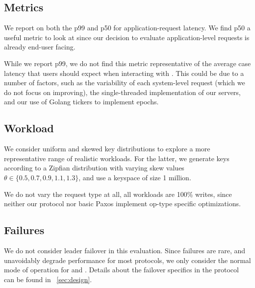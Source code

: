 

\subsection{Metrics}
We report on both the p99 and p50 for application-request latency. 
We find p50 a useful metric to look at since our decision to evaluate application-level requests is already end-user facing. 

While we report p99, we do not find this metric representative of the average case latency that users should expect when interacting with \system. This could be due to a number of factors, such as the variability of each system-level request (which we do not focus on improving), the single-threaded implementation of our servers, and our use of Golang tickers to implement epochs.

\subsection{Workload}
We consider uniform and skewed key distributions to explore a more representative range of realistic workloads. For the latter, we generate keys according to a Zipfian distribution with varying skew values $\theta \in \{0.5, 0.7, 0.9, 1.1, 1.3\}$, and use a keyspace of size 1 million. 

We do not vary the request type at all, all workloads are 100\% writes, since neither our protocol nor basic Paxos implement op-type specific optimizations. 

\subsection{Failures}
We do not consider leader failover in this evaluation. Since failures are rare, and unavoidably degrade performance for most protocols, we only consider the normal mode of operation for \system and \mpaxos. Details about the failover specifics in the protocol can be found in ~\ref{sec:design}.

